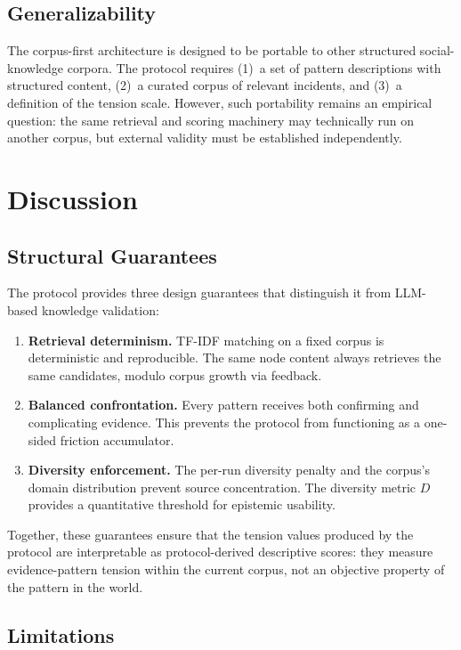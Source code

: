 \documentclass[10pt,twocolumn]{article}
\begin{document}
\subsection{Generalizability}

The corpus-first architecture is designed to be portable to other structured social-knowledge corpora. The protocol requires (1)~a set of pattern descriptions with structured content, (2)~a curated corpus of relevant incidents, and (3)~a definition of the tension scale. However, such portability remains an empirical question: the same retrieval and scoring machinery may technically run on another corpus, but external validity must be established independently.

\section{Discussion}
\label{sec:discussion}

\subsection{Structural Guarantees}

The protocol provides three design guarantees that distinguish it from LLM-based knowledge validation:
\begin{enumerate}
    \item \textbf{Retrieval determinism.} TF-IDF matching on a fixed corpus is deterministic and reproducible. The same node content always retrieves the same candidates, modulo corpus growth via feedback.
    \item \textbf{Balanced confrontation.} Every pattern receives both confirming and complicating evidence. This prevents the protocol from functioning as a one-sided friction accumulator.
    \item \textbf{Diversity enforcement.} The per-run diversity penalty and the corpus's domain distribution prevent source concentration. The diversity metric $D$ provides a quantitative threshold for epistemic usability.
\end{enumerate}
Together, these guarantees ensure that the tension values produced by the protocol are interpretable as protocol-derived descriptive scores: they measure evidence-pattern tension within the current corpus, not an objective property of the pattern in the world.

\subsection{Limitations}
\label{subsec:limitations}
\end{document}
